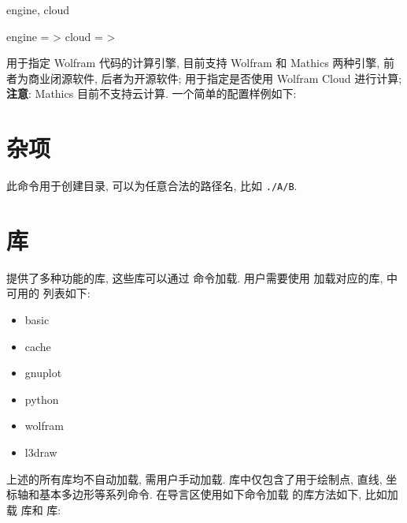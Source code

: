 \documentclass[
  hyper, lang=cn, 
  class=l3dox, 
]{../../zlatex/code/ztex}
\begin{document}
\begin{keyval}[added=2025-05-18, parent=ztikz/wolfram]{engine, cloud}
  \begin{syntax}
    engine = >
    cloud  = >
  \end{syntax}
   用于指定 Wolfram 代码的计算引擎, 目前支持 Wolfram 和 Mathics 两种引擎,
  前者为商业闭源软件, 后者为开源软件;  用于指定是否使用 Wolfram Cloud 进行计算;
  \textbf{注意}: Mathics 目前不支持云计算. 一个简单的配置样例如下:
\end{keyval}
\begin{DocExample}
\usepackage[
  library = { wolfram },
  wolfram = { engine=wolfram, cloud=true }
]{ztikz}
\end{DocExample}


\clearpage
\section{杂项}
\begin{function}[added=2025-05-15]{\ztikzMkdir}
  \begin{syntax}
  \end{syntax}
  此命令用于创建目录,  可以为任意合法的路径名, 比如 \texttt{./A/B}. 
\end{function}



\clearpage
\section{\texorpdfstring{\textcolor{black}{\ztikz}}{zTikZ} 库}
\ztikz{} 提供了多种功能的库, 这些库可以通过  命令加载. 用户需要使用 \texttt{}
加载对应的库, \ztikz{} 中可用的  列表如下:
\begin{multicols}{2}
  \begin{itemize}
    \item basic 
    \item cache
    \item gnuplot
    \item python
    \item wolfram
    \item l3draw
  \end{itemize}
\end{multicols}

上述的所有库均不自动加载, 需用户手动加载.  库中仅包含了用于绘制点, 直线, 坐标轴和基本多边形等系列命令.
在导言区使用如下命令加载  的库方法如下, 比如加载  库和  库:
\begin{DocExample}
\end{DocExample}
\end{document}
